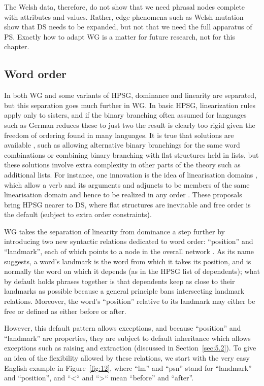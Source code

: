 \documentclass[output=paper]{langscibook}
\begin{document}
The Welsh data, therefore, do not show that we need phrasal nodes complete with attributes and values. Rather, edge phenomena such as Welsh mutation show that DS needs to be expanded, but not that we need the full apparatus of PS. Exactly how to adapt WG is a matter for future research, not for this chapter.


\subsection{Word order}
\label{sec:4.4}

In both WG and some variants of HPSG, dominance and linearity are separated, but this separation goes much further in WG. In basic HPSG, linearization rules apply only to sisters, and if the binary branching often assumed for languages such as German \citep[Section~10.3]{MuellerGT-Eng2} reduces these to just two the result is clearly too rigid given the freedom of ordering found in many languages. It is true that solutions are available \citep[Chapter~10]{MuellerGT-Eng2}, such as allowing alternative binary branchings for the same word combinations or combining binary branching with flat structures held in lists, but these solutions involve extra complexity in other parts of the theory such as additional lists. For instance, one innovation is the idea of linearisation domains \citep{Reape94a,Kathol2000a,Babel}, which allow a verb and its arguments and adjuncts to be members of the same linearisation domain and hence to be realized in any order \citep[302]{MuellerGT-Eng2}. These proposals bring HPSG nearer to DS, where flat structures are inevitable and free order is the default (subject to extra order constraints).

WG takes the separation of linearity from dominance a step further by introducing two new syntactic relations dedicated to word order: ``position'' and ``landmark'', each of which points to a node in the overall network \citep{Hudson2018a}. As its name suggests, a word’s landmark is the word from which it takes its position, and is normally the word on which it depends (as in the HPSG list of dependents); what by default holds phrases together is that dependents keep as close to their landmarks as possible because a general principle bans intersecting landmark relations. Moreover, the word’s ``position'' relative to its landmark may either be free or defined as either before or after.

However, this default pattern allows exceptions, and because ``position'' and ``landmark'' are properties, they are subject to default inheritance which allows exceptions such as raising and extraction (discussed in Section~\ref{sec:5.2}). To give an idea of the flexibility allowed by these relations, we start with the very easy English example in Figure~\ref{fig:12}, where ``lm'' and ``psn'' stand for ``landmark'' and ``position'', and ``<`` and ``>`` mean ``before'' and ``after''.
\end{document}
